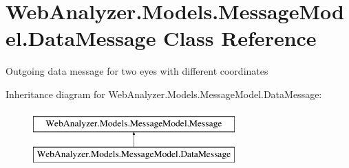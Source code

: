 \hypertarget{class_web_analyzer_1_1_models_1_1_message_model_1_1_data_message}{}\section{Web\+Analyzer.\+Models.\+Message\+Model.\+Data\+Message Class Reference}
\label{class_web_analyzer_1_1_models_1_1_message_model_1_1_data_message}


Outgoing data message for two eyes with different coordinates  


Inheritance diagram for Web\+Analyzer.\+Models.\+Message\+Model.\+Data\+Message\+:\begin{figure}[H]
\begin{center}
\leavevmode
\includegraphics[height=2.000000cm]{class_web_analyzer_1_1_models_1_1_message_model_1_1_data_message}
\end{center}
\end{figure}
